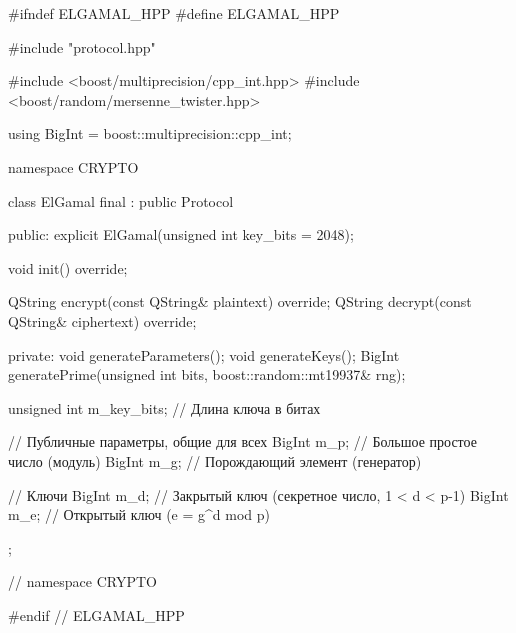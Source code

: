 \begin{nvimstyle}
#ifndef ELGAMAL_HPP
#define ELGAMAL_HPP

#include "protocol.hpp"

#include <boost/multiprecision/cpp_int.hpp>
#include <boost/random/mersenne_twister.hpp>

using BigInt = boost::multiprecision::cpp_int;

namespace CRYPTO
{
class ElGamal final : public Protocol
{
public:
	explicit ElGamal(unsigned int key_bits = 2048);

	void init() override;

	QString encrypt(const QString& plaintext) override;
	QString decrypt(const QString& ciphertext) override;

private:
	void generateParameters();
	void generateKeys();
	BigInt generatePrime(unsigned int bits, boost::random::mt19937& rng);

	unsigned int m_key_bits; // Длина ключа в битах

	// Публичные параметры, общие для всех
	BigInt m_p; // Большое простое число (модуль)
	BigInt m_g; // Порождающий элемент (генератор)

	// Ключи
	BigInt m_d; // Закрытый ключ (секретное число, 1 < d < p-1)
	BigInt m_e; // Открытый ключ (e = g^d mod p)
};

} // namespace CRYPTO

#endif // ELGAMAL_HPP
\end{nvimstyle}